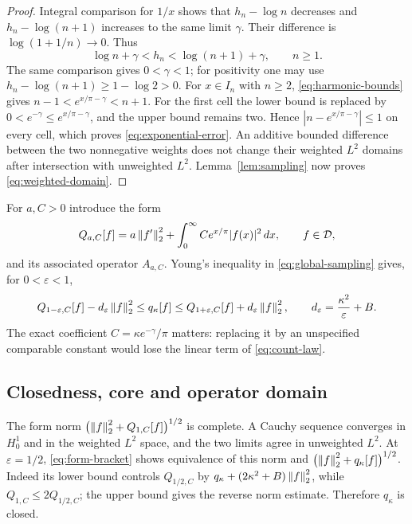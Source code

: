 \begin{proof}
Integral comparison for $1/x$ shows that $h_n-\log n$
decreases and $h_n-\log(n+1)$ increases to the same limit
$\gamma$. Their difference is $\log(1+1/n)\to0$.
Thus
\begin{equation}
\log n+\gamma<h_n<\log(n+1)+\gamma,\qquad n\ge1.
\label{eq:harmonic-bounds}
\end{equation}
The same comparison gives $0<\gamma<1$; for positivity one may
use $h_n-\log(n+1)\ge1-\log2>0$.
For $x\in I_n$ with $n\ge2$,
\eqref{eq:harmonic-bounds} gives
$n-1<e^{x/\pi-\gamma}<n+1$.
For the first cell the lower bound is replaced by
$0<e^{-\gamma}\le e^{x/\pi-\gamma}$, and the upper bound remains
two. Hence $|n-e^{x/\pi-\gamma}|\le1$ on every cell,
which proves \eqref{eq:exponential-error}.
An additive bounded difference between the two nonnegative
weights does not change their weighted $L^2$ domains after
intersection with unweighted $L^2$.
Lemma~\ref{lem:sampling} now proves \eqref{eq:weighted-domain}.
\end{proof}

For $a,C>0$ introduce the form
\begin{equation}
Q_{a,C}[f]=a\left\lVert f'\right\rVert_2^2+
          \int_0^\infty Ce^{x/\pi}|f(x)|^2\,dx,\qquad f\in\mathcal{D},
\label{eq:comparator-form}
\end{equation}
and its associated operator $A_{a,C}$.
Young's inequality in \eqref{eq:global-sampling} gives, for
$0<\varepsilon<1$,
\begin{equation}
Q_{1-\varepsilon,C}[f]-d_\varepsilon\left\lVert f\right\rVert_2^2
\le q_\kappa[f]\le
Q_{1+\varepsilon,C}[f]+d_\varepsilon\left\lVert f\right\rVert_2^2,
\qquad
d_\varepsilon=\frac{\kappa^2}{\varepsilon}+B.
\label{eq:form-bracket}
\end{equation}
The exact coefficient $C=\kappa e^{-\gamma}/\pi$ matters:
replacing it by an unspecified comparable constant would lose
the linear term of \eqref{eq:count-law}.

\subsection{Closedness, core and operator domain}

The form norm $\bigl(\left\lVert f\right\rVert_2^2+Q_{1,C}[f]\bigr)^{1/2}$
is complete.
A Cauchy sequence converges in $H^1_0$ and in the weighted
$L^2$ space, and the two limits agree in unweighted $L^2$.
At $\varepsilon=1/2$, \eqref{eq:form-bracket} shows equivalence
of this norm and $\bigl(\left\lVert f\right\rVert_2^2+q_\kappa[f]\bigr)^{1/2}$.
Indeed its lower bound controls $Q_{1/2,C}$ by
$q_\kappa+(2\kappa^2+B)\left\lVert f\right\rVert_2^2$, while
$Q_{1,C}\le2Q_{1/2,C}$; the upper bound gives the reverse
norm estimate. Therefore $q_\kappa$ is closed.

